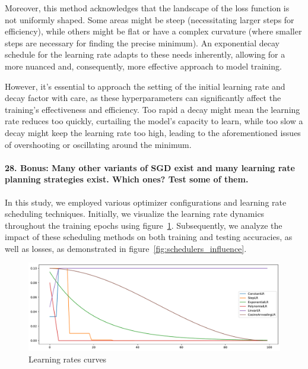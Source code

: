 \documentclass{article}
\theoremstyle{plain}%
\theoremstyle{definition}
\theoremstyle{remark}
\begin{document}
Moreover, this method acknowledges that the landscape of the loss function is not uniformly shaped. Some areas might be steep (necessitating larger steps for efficiency), while others might be flat or have a complex curvature (where smaller steps are necessary for finding the precise minimum). An exponential decay schedule for the learning rate adapts to these needs inherently, allowing for a more nuanced and, consequently, more effective approach to model training.

However, it's essential to approach the setting of the initial learning rate and decay factor with care, as these hyperparameters can significantly affect the training's effectiveness and efficiency. Too rapid a decay might mean the learning rate reduces too quickly, curtailing the model's capacity to learn, while too slow a decay might keep the learning rate too high, leading to the aforementioned issues of overshooting or oscillating around the minimum.

\paragraph{28. \textbf{Bonus}: Many other variants of SGD exist and many learning rate planning strategies exist. Which ones? Test some of them.}

In this study, we employed various optimizer configurations and learning rate scheduling techniques. Initially, we visualize the learning rate dynamics throughout the training epochs using figure~\ref{fig:schedulers_comparison}. Subsequently, we analyze the impact of these scheduling methods on both training and testing accuracies, as well as losses, as demonstrated in figure~\ref{fig:schedulers_influence}.

\begin{figure}[H]
    \centering
    \includegraphics*[width=\textwidth]{figs/CNN/schedulers_comparison.pdf}
    \caption{Learning rates curves}
    \label{fig:schedulers_comparison}
\end{figure}
\end{document}
